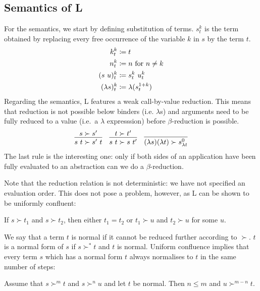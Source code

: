 \subsection{Semantics of L}
For the semantics, we start by defining substitution of terms. $s^k_t$ is the term obtained by replacing every free occurrence of the variable $k$ in $s$ by the term $t$. 
\begin{align*}
  k^k_t &\coloneqq t \\
  n^k_t &\coloneqq n \text{ for } n \neq k \\
  (s~u)^k_t &\coloneqq s^k_t ~ u^k_t \\
  (\lambda s)^k_t &\coloneqq \lambda (s^{1 +{k}}_t) 
\end{align*}
Regarding the semantics, L features a weak call-by-value reduction. This means that reduction is not possible below binders (i.e. $\lambda$s) and arguments need to be fully reduced to a value (i.e.\ a $\lambda$ expresssion) before $\beta$-reduction is possible.
\begin{align*}
  \infer{s~t \succ s'~t}{s \succ s'} \quad \infer{s~t \succ s~t'}{t \succ t'} \quad \infer{(\lambda s)(\lambda t) \succ s^0_{\lambda t}}{} 
\end{align*}
The last rule is the interesting one: only if both sides of an application have been fully evaluated to an abstraction can we do a $\beta$-reduction. 

Note that the reduction relation is not deterministic: we have not specified an evaluation order. This does not pose a problem, however, as L can be shown to be uniformly confluent: 
\begin{fact}
  If $s \succ t_1$ and $s \succ t_2$, then either $t_1 = t_2$ or $t_1 \succ u$ and $t_2 \succ u$ for some $u$.
\end{fact}
We say that a term $t$ is normal if it cannot be reduced further according to $\succ$. $t$ is a normal form of $s$ if $s \succ^* t$ and $t$ is normal. 
Uniform confluence implies that every term $s$ which has a normal form $t$ always normalises to $t$ in the same number of steps: 
\begin{corollary}
  Assume that $s \succ^m t$ and $s \succ^n u$ and let $t$ be normal. Then $n \le m$ and $u \succ^{m - n} t$.
\end{corollary}

